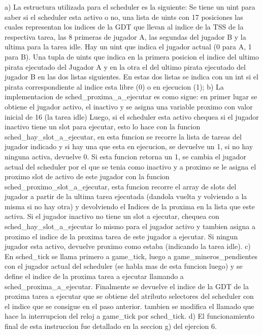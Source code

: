 a) La estructura utilizada para el scheduler es la siguiente:
  Se tiene un uint para saber si el scheduler esta activo o no, una lista de uints con 17 posiciones las cuales
  representan los indices de la GDT que llevan al indice de la TSS de la respectiva tarea, las 8 primeras de jugador A,
  las segundas del jugador B y la ultima para la tarea idle.
  Hay un uint que indica el jugador actual (0 para A, 1 para B).
  Una tupla de uints que indica en la primera posicion el indice del ultimo pirata ejecutado del Jugador A y en la otra el del
  ultimo pirata ejecutado del jugador B en las dos listas siguientes.
  En estas dos listas se indica con un int si el pirata correspondiente al indice esta libre (0) o en ejecucion (1);
b) La implementacion de sched_proxima_a_ejecutar es como sigue:
  en primer lugar se obtiene el jugador activo, el inactivo y se asigna una variable proximo con valor inicial de 16 (la tarea idle)
  Luego, si el scheduler esta activo chequea si el jugador inactivo tiene un slot para ejecutar, esto lo hace con la
  funcion sched_hay_slot_a_ejecutar, en esta funcion se recorre la lista de tareas del jugador indicado y si hay una que esta
  en ejecucion, se devuelve un 1, si no hay ninguna activa, devuelve 0.
  Si esta funcion retorna un 1, se cambia el jugador actual del scheduler por el que se tenia como inactivo y a proximo se le asigna
  el proximo slot de activo de este jugador con la funcion sched_proximo_slot_a_ejecutar, esta funcion recorre el array de slots
  del jugador a partir de la ultima tarea ejecutada (dandola vuelta y volviendo a la misma si no hay otra) y devolviendo el Indices
  de la proxima en la lista que este activa.
  Si el jugador inactivo no tiene un slot a ejecutar, chequea con sched_hay_slot_a_ejecutar lo mismo para el jugador activo y
  tambien asigna a proximo el indice de la proxima tarea de este jugador a ejecutar.
  Si ningun jugador esta activo, devuelve proximo como estaba (indicando la tarea idle).
c) En sched_tick se llama primero a game_tick, luego a game_mineros_pendientes con el jugador actual del scheduler (se habla mas
  de esta funcion luego) y se define el indice de la proxima tarea a ejecutar llamando a sched_proxima_a_ejecutar.
  Finalmente se devuelve el indice de la GDT de la proxima tarea a ejecutar que se obtiene del atributo selectores del scheduler
  con el indice que se consigue en el paso anterior. tambien se modifica el llamado que hace la interrupcion del reloj a game_tick
  por sched_tick.
d) El funcionamiento final de esta instruccion fue detallado en la seccion g) del ejercion 6.
